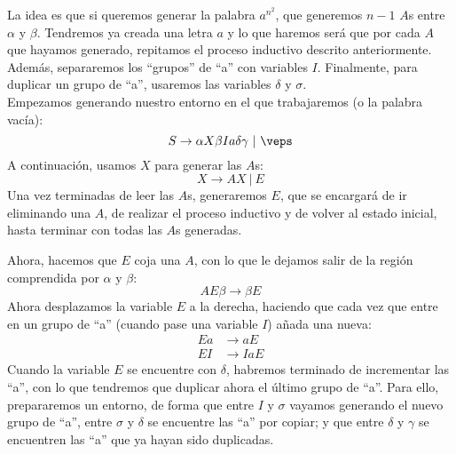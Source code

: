 \begin{ejercicio}
\begin{enumerate}
            La idea es que si queremos generar la palabra $a^{n^2}$, que generemos $n-1$ $A$s entre $\alpha$ y $\beta$. Tendremos ya creada una letra $a$ y lo que haremos será que por cada $A$ que hayamos generado, repitamos el proceso inductivo descrito anteriormente. Además, separaremos los ``grupos'' de ``a'' con variables $I$.
            Finalmente, para duplicar un grupo de ``a'', usaremos las variables $\delta$ y $\sigma$.\\

                Empezamos generando nuestro entorno en el que trabajaremos (o la palabra vacía):
                \begin{equation*}
                    S \rightarrow \alpha X \beta Ia\delta \gamma \ |\ \veps
                \end{equation*}
                A continuación, usamos $X$ para generar las $A$s:
                \begin{equation*}
                    X \rightarrow AX\ |\ E
                \end{equation*}
                Una vez terminadas de leer las $A$s, generaremos $E$, que se encargará de ir eliminando una $A$, de realizar el proceso inductivo y de volver al estado inicial, hasta terminar con todas las $A$s generadas.

             Ahora, hacemos que $E$ coja una $A$, con lo que le dejamos salir de la región comprendida por $\alpha$ y $\beta$:
                \begin{equation*}
                    AE\beta \rightarrow \beta E
                \end{equation*}
                Ahora desplazamos la variable $E$ a la derecha, haciendo que cada vez que entre en un grupo de ``a'' (cuando pase una variable $I$) añada una nueva:
                \begin{align*}
                    Ea &\rightarrow aE \\
                    EI &\rightarrow IaE
                \end{align*}
                Cuando la variable $E$ se encuentre con $\delta$, habremos terminado de incrementar las ``a'', con lo que tendremos que duplicar ahora el último grupo de ``a''. Para ello, prepararemos un entorno, de forma que entre $I$ y $\sigma$ vayamos generando el nuevo grupo de ``a'', entre $\sigma$ y $\delta$ se encuentre las ``a'' por copiar; y que entre $\delta$ y $\gamma$ se encuentren las ``a'' que ya hayan sido duplicadas.


\end{enumerate}
\end{ejercicio}

